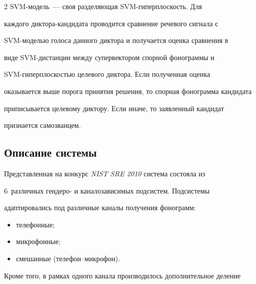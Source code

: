 \begin{multicols}{2}
SVM-мо\-дель~--- своя разделяющая SVM-ги\-пер\-плос\-кость. Для 


каждого дик\-то\-ра-кан\-ди\-да\-та проводится сравнение речевого сигнала с 


SVM-мо\-делью голоса данного диктора и получается оценка сравнения в 


виде SVM-дис\-тан\-ции между супервектором спорной фонограммы и 


  SVM-ги\-пер\-плос\-костью целевого диктора. Если полученная оценка 


оказывается выше порога принятия решения, то спорная фонограмма кандидата 


приписывается целевому диктору. Если иначе, то заявленный кандидат 


признается самозванцем.





\vspace*{-6pt}





\subsection{Описание системы} %


  


  Представленная на конкурс \textit{NIST SRE 2010} сис\-те\-ма состояла из 


6~различных гендеро- и каналозависимых подсистем. Подсистемы 


адаптировались под различные каналы получения фонограмм:\\[-15pt]


  \begin{itemize}


\item телефонные;\\[-15pt]


\item микрофонные;\\[-15pt]


\item смешанные (телефон--мик\-ро\-фон).\\[-15pt]


\end{itemize}





  Кроме того, в рамках одного канала производилось дополнительное деление 



\end{multicols}
